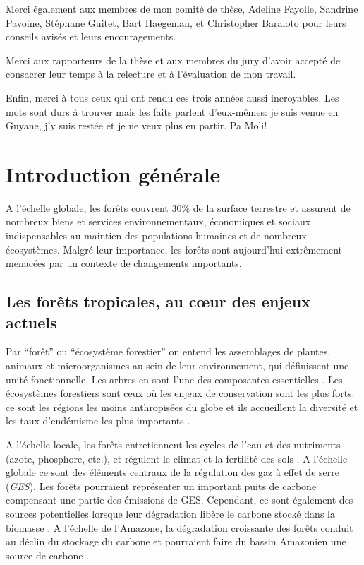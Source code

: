 \documentclass[
  11pt,
  french,
  A4paper,
  extrafontsizes,onecolumn,openright
  ]{memoir}
\begin{document}
Merci également aux membres de mon comité de thèse, Adeline Fayolle,
Sandrine Pavoine, Stéphane Guitet, Bart Haegeman, et Christopher
Baraloto pour leurs conseils avisés et leurs encouragements.

Merci aux rapporteurs de la thèse et aux membres du jury d'avoir accepté
de consacrer leur temps à la relecture et à l'évaluation de mon travail.

Enfin, merci à tous ceux qui ont rendu ces trois années aussi
incroyables. Les mots sont durs à trouver mais les faits parlent
d'eux-mêmes: je suis venue en Guyane, j'y suis restée et je ne veux plus
en partir. Pa Moli!

\chapter{Introduction générale}\label{introduction-generale}

A l'échelle globale, les forêts couvrent 30\% de la surface terrestre et
assurent de nombreux biens et services environnementaux, économiques et
sociaux indispensables au maintien des populations humaines et de
nombreux écosystèmes. Malgré leur importance, les forêts sont
aujourd'hui extrêmement menacées par un contexte de changements
importants.

\section{Les forêts tropicales, au cœur des enjeux
actuels}\label{les-forets-tropicales-au-cur-des-enjeux-actuels}

Par ``forêt'' ou ``écosystème forestier'' on entend les assemblages de
plantes, animaux et microorganismes au sein de leur environnement, qui
définissent une unité fonctionnelle. Les arbres en sont l'une des
composantes essentielles \autocite{FRA2000}. Les écosystèmes forestiers
sont ceux où les enjeux de conservation sont les plus forts: ce sont les
régions les moins anthropisées du globe et ils accueillent la diversité
et les taux d'endémisme les plus importants
\autocites{Myers2000}{Mittermeier2003}.

A l'échelle locale, les forêts entretiennent les cycles de l'eau et des
nutriments (azote, phosphore, etc.), et régulent le climat et la
fertilité des sols \autocites{Malhi2008}{Isbell2017}. A l'échelle
globale ce sont des éléments centraux de la régulation des gaz à effet
de serre (\emph{GES}). Les forêts pourraient représenter un important
puits de carbone compensant une partie des émissions de GES. Cependant,
ce sont également des sources potentielles lorsque leur dégradation
libère le carbone stocké dans la biomasse \autocites{Pan2011}{Roy2017}.
A l'échelle de l'Amazone, la dégradation croissante des forêts conduit
au déclin du stockage du carbone et pourraient faire du bassin Amazonien
une source de carbone \autocite{Brienen2015}.
\end{document}
